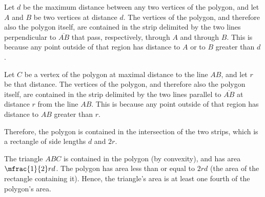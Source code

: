 Let $d$ be the maximum distance between any two vertices of the polygon,
and let $A$ and $B$ be two vertices at distance $d$.
The vertices of the polygon, and therefore also the polygon itself,
are contained in the strip delimited by the two lines perpendicular to $\overline{AB}$ that pass, respectively, through $A$ and through $B$.
This is because any point outside of that region has distance to $A$ or to $B$ greater than $d$.

Let $C$ be a vertex of the polygon at maximal distance to the line $AB$,
and let $r$ be that distance.
The vertices of the polygon, and therefore also the polygon itself,
are contained in the strip delimited by the two lines parallel to $\overline{AB}$ at distance $r$ from the line $AB$.
This is because any point outside of that region has distance to $AB$ greater than $r$.

Therefore, the polygon is contained in the intersection of the two strips,
which is a rectangle of side lengths $d$ and $2 r$.

The triangle $ABC$ is contained in the polygon (by convexity),
and has area $\mfrac{1}{2} r d$.
The polygon has area less than or equal to $2 r d$
(the area of the rectangle containing it).
Hence, the triangle's area is at least one fourth of the polygon's area.
